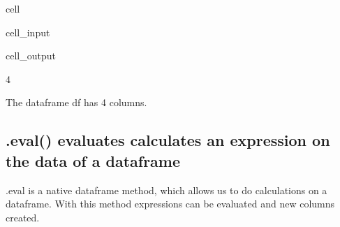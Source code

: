 \documentclass[letterpaper,10pt,english]{jupyterBook}
\begin{document}
\begin{sphinxuseclass}{cell}\begin{sphinxVerbatimInput}

\begin{sphinxuseclass}{cell_input}
\begin{sphinxVerbatim}[commandchars=\\\{\}]
\end{sphinxVerbatim}

\end{sphinxuseclass}\end{sphinxVerbatimInput}
\begin{sphinxVerbatimOutput}

\begin{sphinxuseclass}{cell_output}
\begin{sphinxVerbatim}[commandchars=\\\{\}]
4
\end{sphinxVerbatim}

\end{sphinxuseclass}\end{sphinxVerbatimOutput}

\end{sphinxuseclass}
\sphinxAtStartPar
The dataframe df has 4 columns.


\subsection{.eval() evaluates calculates an expression on the data of a dataframe}
\label{\detokenize{content/04_PythonEssentials/PythonPackagesEtc:eval-evaluates-calculates-an-expression-on-the-data-of-a-dataframe}}
\sphinxAtStartPar
.eval is a native dataframe method, which allows us to do calculations on a dataframe. With this method expressions can be evaluated and new columns created.
\end{document}
